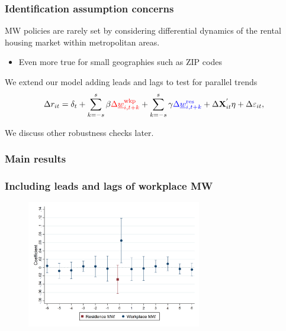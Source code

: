 \documentclass[aspectratio=169, t]{beamer}
\newcommand{\mw}{\underline{w}}
\newcommand{\wkp}{\text{wkp}}
\newcommand{\res}{\text{res}}
\begin{document}
\begin{frame}[label = dyn_model]
    \frametitle{Identification assumption concerns}
    
    MW policies are rarely set by considering differential dynamics of the 
    rental housing market within metropolitan areas.
    \begin{itemize}
        \item Even more true for small geographies such as ZIP codes
    \end{itemize}

    \vspace{2mm}
    \pause
    We extend our model adding leads and lags to test for parallel trends
    $$
    \Delta r_{it} = \delta_t +
        \sum_{k=-s}^{s} \beta {\color{red}\Delta \mw^{\wkp}_{i,t+k}} +
        \sum_{k=-s}^{s} \gamma {\color{blue} \Delta \mw^{\res}_{i,t+k}} + 
        \Delta \mathbf{X}^{'}_{it} \eta + 
        \Delta \varepsilon_{it} ,
    $$

    \vspace{2mm}
    We discuss other robustness checks later.
\end{frame}

\begin{frame}[label = static]
    \frametitle{Main results}

    
    
\end{frame}

\begin{frame}[label = dyn_baseline_plot]
    \frametitle{Including leads and lags of workplace MW}

    \begin{figure}
        \centering
        \includegraphics[width=0.68\textwidth]{fd_baseline/output/fd_both_mw_wkp_only_dynamic.png}
    \end{figure}
    
    \hyperlink{exclude_res}{}
    \hyperlink{res_only_dyn}{}
    \hyperlink{both_dyn}{}
\end{frame}
\end{document}
